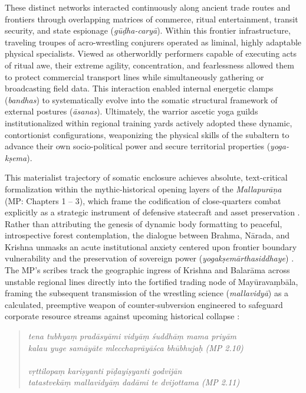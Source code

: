 \documentclass[11pt,twoside,letterpaper]{article}
\begin{document}
These distinct networks interacted continuously along ancient trade routes and frontiers through overlapping matrices of commerce, ritual entertainment, transit security, and state espionage (\textit{gūḍha-caryā}). Within this frontier infrastructure, traveling troupes of acro-wrestling conjurers operated as liminal, highly adaptable physical specialists. Viewed as otherworldly performers capable of executing acts of ritual awe, their extreme agility, concentration, and fearlessness allowed them to protect commercial transport lines while simultaneously gathering or broadcasting field data. This interaction enabled internal energetic clamps (\textit{bandhas}) to systematically evolve into the somatic structural framework of external postures (\textit{āsanas}). Ultimately, the warrior ascetic yoga guilds institutionalized within regional training yards actively adopted these dynamic, contortionist configurations, weaponizing the physical skills of the subaltern to advance their own socio-political power and secure territorial properties (\textit{yoga-kṣema}).

This materialist trajectory of somatic enclosure achieves absolute, text-critical formalization within the mythic-historical opening layers of the \textit{Mallapurāṇa} (MP: Chapters 1 -- 3), which frame the codification of close-quarters combat explicitly as a strategic instrument of defensive statecraft and asset preservation \citep{MP_7}. Rather than attributing the genesis of dynamic body formatting to peaceful, introspective forest contemplation, the dialogue between Brahma, Nārada, and Krishna unmasks an acute institutional anxiety centered upon frontier boundary vulnerability and the preservation of sovereign power (\textit{yogakṣemārthasiddhaye}) \citep{MP_7}. The MP's scribes track the geographic ingress of Krishna and Balarāma across unstable regional lines directly into the fortified trading node of Mayūravaṃbāla, framing the subsequent transmission of the wrestling science (\textit{mallavidyā}) as a calculated, preemptive weapon of counter-subversion engineered to safeguard corporate resource streams against upcoming historical collapse \citep{MP_7}:

\begin{quote}
\noindent\textit{tena tubhyaṃ pradāsyāmi vidyāṃ śuddhāṃ mama priyām } \\
\noindent\textit{kalau yuge samāyāte mlecchaprāyāśca bhūbhujaḥ (MP 2.10) } \\
\\
\noindent\textit{vṛttilopaṃ kariṣyanti pīḍayiṣyanti godvijān } \\
\noindent\textit{tatastvekāṃ mallavidyāṃ dadāmi te dvijottama (MP 2.11) }
\end{quote}
\end{document}
